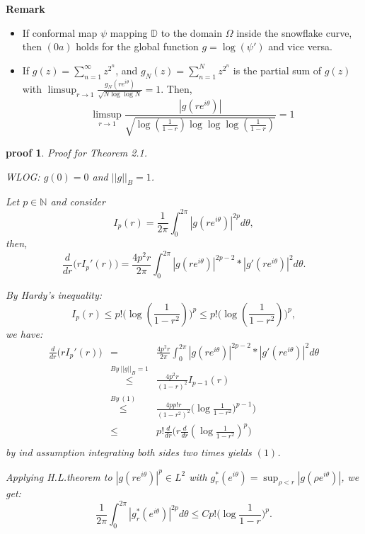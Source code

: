 \documentclass{article}
\theoremstyle{plain}
\newtheorem*{prf}{proof}
\theoremstyle{definition}
\theoremstyle{remark}
\begin{document}
\textbf{Remark}
\begin{itemize}
    \item If conformal map $\psi$ mapping $\mathbb{D}$ to the domain $\Omega$ inside the snowflake curve, then $(0a)$ holds for the global function $g=\log(\psi')$ and vice versa.
    \item If $g(z)=\sum_{n=1}^{\infty}z^{2^n}$, and $g_N(z)=\sum_{n=1}^{N}z^{2^n}$ is the partial sum of $g(z)$ with $\limsup_{r\to 1}\frac{g_N(re^{i\theta})}{\sqrt{N\log\log N}}=1$. Then,
    $$\limsup_{r\to{1}}\frac{|g(re^{i\theta})|}{\sqrt{\log(\frac{1}{1-r})\log\log\log(\frac{1}{1-r})}}=1$$
\end{itemize}
\begin{prf} Proof for Theorem 2.1.

WLOG: $g(0)=0$ and $||g||_B=1$.

Let $p\in\mathbb{N}$ and consider 
$$I_p(r)=\frac{1}{2\pi}\int^{2\pi}_{0}|g(re^{i\theta})|^{2p}d\theta,$$
then,
$$\frac{d}{dr}\big(rI_p'(r)\big)=\frac{4p^2r}{2\pi}\int^{2\pi}_{0}|g(re^{i\theta})|^{2p-2}*|g'(re^{i\theta})|^2d\theta.$$

By Hardy's inequality:
\begin{equation}
    I_p(r)\leq p!\big(\log(\frac{1}{1-r^2})\big)^p\leq p!\big(\log(\frac{1}{1-r^2})\big)^p,
\end{equation}
we have:
\begin{equation*}
  \begin{array}{lcl}
       \frac{d}{dr}\big(rI_p'(r)\big)&=&\frac{4p^2r}{2\pi}\int^{2\pi}_{0}|g(re^{i\theta})|^{2p-2}*|g'(re^{i\theta})|^2d\theta  \\
       &\overset{By\ ||g||_B=1}{\leq}& \frac{4p^2r}{(1-r)^2}I_{p-1}(r)\\
                     &\overset{By\ (1)}{\leq}& \frac{4pp!r}{(1-r^2)^2}\big(\log\frac{1}{1-r^2})^{p-1}\big)\\
              &\leq& p!\frac{d}{dr}\big(r\frac{d}{dr}(\log\frac{1}{1-r^2})^p\big)\\
  \end{array}  
\end{equation*}
by ind assumption integrating both sides two times yields $(1)$.

Applying H.L.theorem to $|g(re^{i\theta})|^p\in L^2$ with $g^*_r(e^{i\theta})=\sup_{\rho<r}|g(\rho e^{i\theta})|$, we get:
\begin{equation}
    \frac{1}{2\pi}\int^{2\pi}_{0}|g_r^*(e^{i\theta})|^{2p}d\theta\leq Cp!\big(\log\frac{1}{1-r}\big)^p.
\end{equation}


\end{prf}
\end{document}
